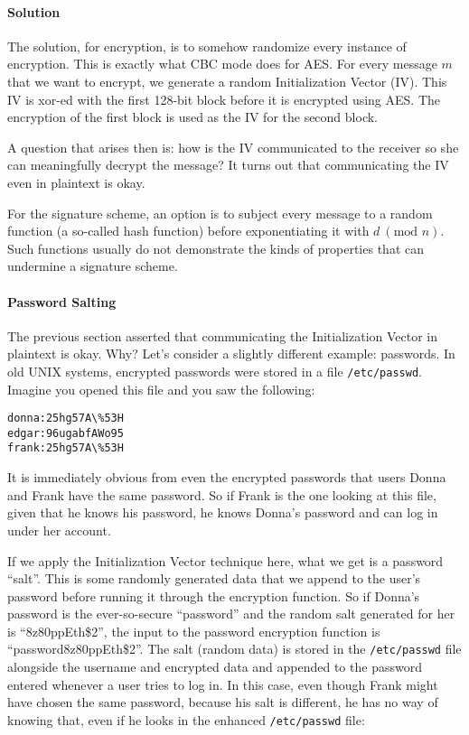 \paragraph{Solution} The solution, for encryption, is to somehow randomize every
instance of encryption. This is exactly what CBC mode does for AES. For every
message $m$ that we want to encrypt, we generate a random Initialization Vector
(IV). This IV is xor-ed with the first 128-bit block before it is encrypted using
AES. The encryption of the first block is used as the IV for the second block.

A question that arises then is: how is the IV communicated to the receiver so she
can meaningfully decrypt the message? It turns out that communicating the IV
even in plaintext is okay.

For the signature scheme, an option is to subject every message to a random 
function (a so-called hash function) before exponentiating it with
$d~(\text{mod } n)$. Such functions usually do not demonstrate the kinds
of properties that can undermine a signature scheme.

\paragraph{Password Salting} The previous section asserted that communicating the Initialization Vector in plaintext is okay. Why? Let's consider a slightly different example: passwords. In old UNIX systems, encrypted passwords were stored in a file \texttt{/etc/passwd}. Imagine you opened this file and you saw the following:
\begin{verbatim}
donna:25hg57A\%53H
edgar:96ugabfAWo95
frank:25hg57A\%53H
\end{verbatim}

It is immediately obvious from even the encrypted passwords that users Donna and Frank have the same password. So if Frank is the one looking at this file, given that he knows his password, he knows Donna's password and can log in under her account.

If we apply the Initialization Vector technique here, what we get is a password ``salt''. This is some randomly generated data that we append to the user's password before running it through the encryption function. So if Donna's password is the ever-so-secure ``password'' and the random salt generated for her is ``8z80ppEth\$2'', the input to the password encryption function is ``password8z80ppEth\$2''. The salt (random data) is stored in the \texttt{/etc/passwd} file alongside the username and encrypted data and appended to the password entered whenever a user tries to log in. In this case, even though Frank might have chosen the same password, because his salt is different, he has no way of knowing that, even if he looks in the enhanced \texttt{/etc/passwd} file:

